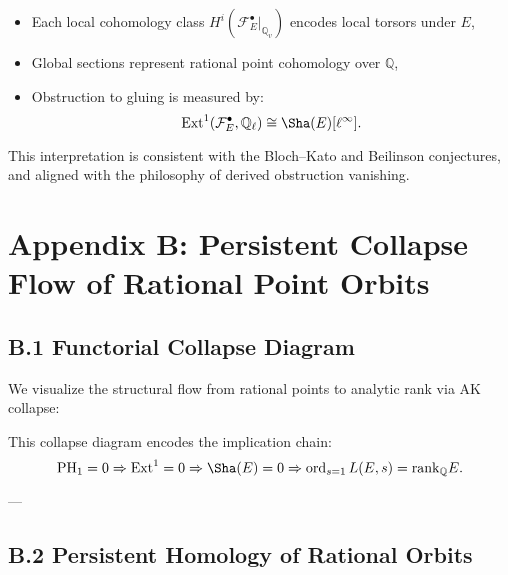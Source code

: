 \begin{itemize}
    \item Each local cohomology class \( H^i(\mathcal{F}_E^\bullet|_{\mathbb{Q}_v}) \) encodes local torsors under \( E \),
    \item Global sections represent rational point cohomology over \( \mathbb{Q} \),
    \item Obstruction to gluing is measured by:
    \[
    \mathrm{Ext}^1(\mathcal{F}_E^\bullet, \mathbb{Q}_\ell) \cong \Sha(E)[\ell^\infty].
    \]
\end{itemize}

This interpretation is consistent with the Bloch–Kato and Beilinson conjectures, and aligned with the philosophy of derived obstruction vanishing.


\section*{Appendix B: Persistent Collapse Flow of Rational Point Orbits}

\subsection*{B.1 Functorial Collapse Diagram}

We visualize the structural flow from rational points to analytic rank via AK collapse:

\begin{center}
\end{center}

\medskip

This collapse diagram encodes the implication chain:
\[
\mathrm{PH}_1 = 0 \Rightarrow \mathrm{Ext}^1 = 0 \Rightarrow \Sha(E) = 0 \Rightarrow \operatorname{ord}_{s=1}L(E,s) = \mathrm{rank}_\mathbb{Q}E.
\]

---

\subsection*{B.2 Persistent Homology of Rational Orbits}

